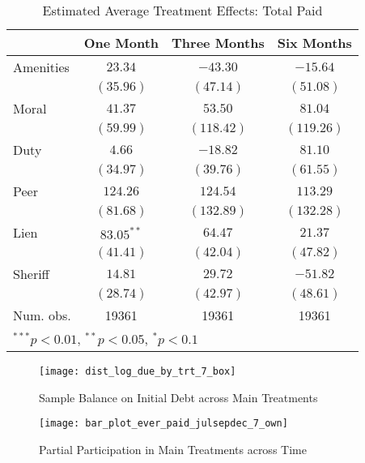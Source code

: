 \documentclass[12pt,titlepage]{article}
\begin{document}
\begin{table}[htbp]
\caption{Estimated Average Treatment Effects: Total Paid}
\begin{center}
\begin{tabular}{l c c c }
\hline
          & One Month & Three Months & Six Months \\
\hline
Amenities & $23.34$      & $-43.30$   & $-15.64$   \\
          & $(35.96)$    & $(47.14)$  & $(51.08)$  \\
Moral     & $41.37$      & $53.50$    & $81.04$    \\
          & $(59.99)$    & $(118.42)$ & $(119.26)$ \\
Duty      & $4.66$       & $-18.82$   & $81.10$    \\
          & $(34.97)$    & $(39.76)$  & $(61.55)$  \\
Peer      & $124.26$     & $124.54$   & $113.29$   \\
          & $(81.68)$    & $(132.89)$ & $(132.28)$ \\
Lien      & $83.05^{**}$ & $64.47$    & $21.37$    \\
          & $(41.41)$    & $(42.04)$  & $(47.82)$  \\
Sheriff   & $14.81$      & $29.72$    & $-51.82$   \\
          & $(28.74)$    & $(42.97)$  & $(48.61)$  \\
\hline
Num. obs. & 19361        & 19361      & 19361      \\
\hline
\multicolumn{4}{l}{\scriptsize{$^{***}p<0.01$, $^{**}p<0.05$, $^*p<0.1$}}
\end{tabular}
\label{tbl:reg_tp}
\end{center}
\end{table}

\begin{figure}[htpb]
\begin{center}
\caption{Sample Balance on Initial Debt across Main Treatments}
\label{fig:box_bal}
\bigskip
\texttt{[image: dist\_log\_due\_by\_trt\_7\_box]}
\end{center}
\end{figure}

\begin{figure}[htpb]
\begin{center}
\caption{Partial Participation in Main Treatments across Time}
\label{fig:ep_time_7_own}
\bigskip
\texttt{[image: bar\_plot\_ever\_paid\_julsepdec\_7\_own]}
\end{center}
\end{figure}
\end{document}
